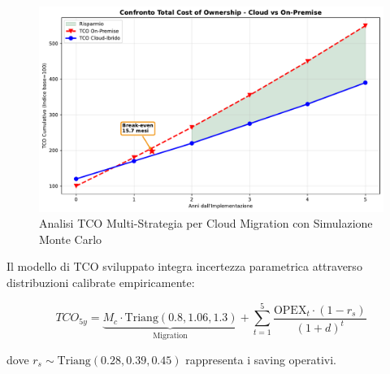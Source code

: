 \begin{figure}[htbp]
\centering
\includegraphics[width=\textwidth]{thesis_figures/cap3/fig_3_4_tco_comparison.pdf}
\caption{Analisi TCO Multi-Strategia per Cloud Migration con Simulazione Monte Carlo}
\label{fig:cloud_tco}
\end{figure}

Il modello di TCO sviluppato integra incertezza parametrica attraverso 
distribuzioni calibrate empiricamente:

\begin{equation}
TCO_{5y} = \underbrace{M_c \cdot \text{Triang}(0.8, 1.06, 1.3)}_{\text{Migration}} + 
           \sum_{t=1}^{5} \frac{\text{OPEX}_t \cdot (1-r_s)}{(1+d)^t}
\end{equation}

dove $r_s \sim \text{Triang}(0.28, 0.39, 0.45)$ rappresenta i saving operativi.

